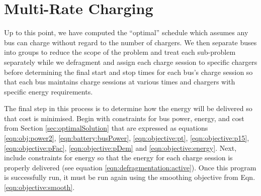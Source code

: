 \section{Multi-Rate Charging}
Up to this point, we have computed the ``optimal'' schedule which assumes any bus can charge without regard to the number of chargers. We then separate buses into groups to reduce the scope of the problem and treat each sub-problem separately while we defragment and assign each charge session to specific chargers before determining the final start and stop times for each bus's charge session so that each bus maintains charge sessions at various times and chargers with specific energy requirements. 
\par The final step in this process is to determine how the energy will be delivered so that cost is minimised. Begin with constraints for bus power, energy, and cost from Section \ref{sec:optimalSolution} that are expressed as equations \ref{eqn:obj:power2}, \ref{eqn:battery:busPower}, \ref{eqn:objective:pt}, \ref{eqn:objective:p15}, \ref{eqn:objective:pFac}, \ref{eqn:objective:pDem} and \ref{eqn:objective:energy}. Next, include constraints for energy so that the energy for each charge session is properly delivered (see equation \ref{eqn:defragmentation:active}). Once this program is successfully run, it must be run again using the smoothing objective from Eqn. \ref{eqn:objective:smooth}.
